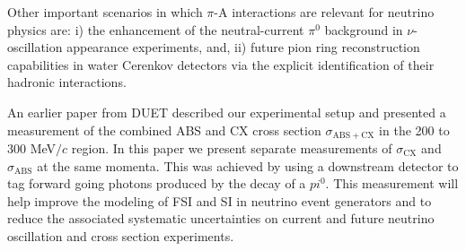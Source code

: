 Other important scenarios in which $\pi$-A interactions are relevant for neutrino physics are: i) the enhancement of the neutral-current $\pi^{0}$ background in $\nu$-oscillation appearance experiments, and, ii) future pion ring reconstruction capabilities in water Cerenkov detectors via the explicit identification of their hadronic interactions.

An earlier paper from DUET \cite{duet} described our experimental setup and presented a measurement of the combined ABS and CX cross section $\sigma_{\mathrm{ABS}+\mathrm{CX}}$ in the 200 to 300 MeV$/c$ region. In this paper we present separate measurements of $\sigma_{\mathrm{CX}}$ and $\sigma_{\mathrm{ABS}}$ at the same momenta. This was achieved by using a downstream detector to tag forward going photons produced by the decay of a $pi^0$. This measurement will help improve the modeling of FSI and SI in neutrino event generators and to reduce the associated systematic uncertainties on current and future neutrino oscillation and cross section experiments.